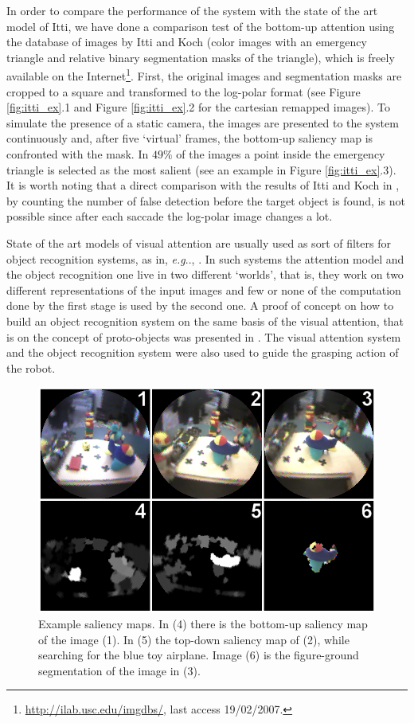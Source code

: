 \documentclass{llncs}
\makeatletter
\DeclareRobustCommand\onedot{\futurelet\@let@token\@onedot}
\def\@onedot{\ifx\@let@token.\else.\null\fi\xspace}
\def\eg{\emph{e.g}\onedot} \def\Eg{\emph{E.g}\onedot}
\makeatother
\begin{document}
In order to compare the performance of the system
with the state of the art model of Itti, we
have done a comparison test of the bottom-up attention
using the database of images by Itti and Koch \cite{IttiK01b} (color
images with an emergency triangle and relative binary
segmentation masks of the triangle), which is freely
available on the Internet\footnote{\url{http://ilab.usc.edu/imgdbs/}, last access 19/02/2007.}.
First, the original images and segmentation masks are
cropped to a square and transformed to the log-polar
format (see Figure \ref{fig:itti_ex}.1 and Figure \ref{fig:itti_ex}.2
for the cartesian remapped images). To simulate the
presence of a static camera, the images are presented to
the system continuously and, after five `virtual'
frames, the bottom-up saliency map is confronted with
the mask. In $49\%$ of the images a point inside the
emergency triangle is selected as the most salient
(see an example in Figure \ref{fig:itti_ex}.3). It is worth noting that a
direct comparison with the results of Itti and Koch in \cite{IttiK01b}, by
counting the number of false detection before the
target object is found, is not possible since after each
saccade the log-polar image changes a lot.

State of the art models of visual attention are usually used as
sort of filters for object recognition systems, as in, \eg, \cite{WaltherK06}.
In such systems the attention model and the object recognition one
live in two different `worlds', that is, they work on two
different representations of the input images and few or none
of the computation done by the first stage is used by the
second one. A proof of concept on how to build an object
recognition system on the same basis of the visual attention,
that is on the concept of proto-objects was presented in
\cite{Orabona07}. The visual attention system and the object recognition
system were also used to guide the grasping action of the robot.


\begin{figure}[]
  \begin{center}
    \includegraphics[width=0.9\linewidth]{./figs/attention/a3}
    \caption{Example saliency maps. In (4) there is the 
     bottom-up saliency map of the image (1). In (5) the top-down
	   saliency map of (2), while searching for the blue
	   toy airplane. Image (6) is the figure-ground
	   segmentation of the image in (3).}
    \label{fig:out_ex}
  \end{center}
\end{figure}
\end{document}
